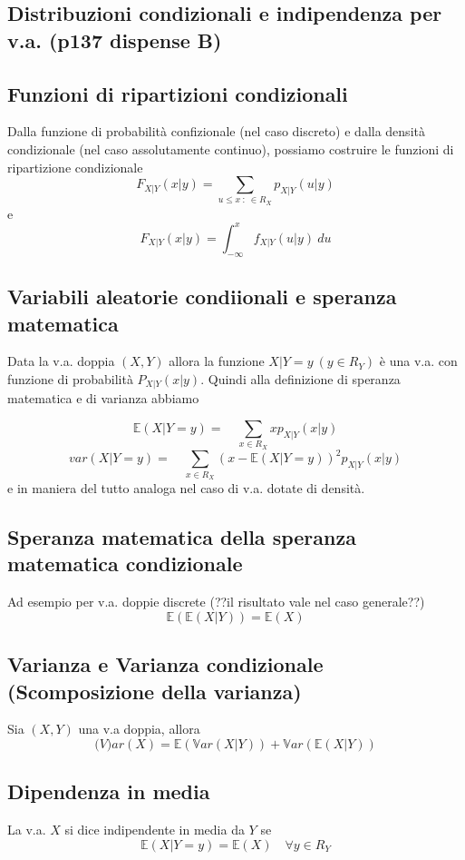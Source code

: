 \documentclass[a4paper]{report}
\begin{document}
  \subsection{Distribuzioni condizionali e indipendenza per v.a. (p137 dispense B)}

  \subsection{Funzioni di ripartizioni condizionali}
  Dalla funzione di probabilità confizionale (nel caso discreto) e dalla densità condizionale (nel caso assolutamente continuo), possiamo costruire le funzioni di ripartizione condizionale
  \[ F_{X|Y}(x|y) = \sum_{u \leq x \: : \: \in R_X} p_{X|Y}(u|y) \]
  e
  \[ F_{X|Y}(x|y) = \int_{-\infty}^{x} f_{X|Y}(u|y) \: du \]

  \subsection{Variabili aleatorie condiionali e speranza matematica}
  Data la v.a. doppia $(X,Y)$ allora la funzione $X|Y = y \: (y \in R_Y)$ è una v.a. con funzione di probabilità $P_{X|Y}(x|y)$.
    Quindi alla definizione di speranza matematica e di varianza abbiamo

  \[\mathbb{E}(X|Y=y)= \quad \sum_{x \in R_X} x p_{X|Y}(x|y) \]
  \[ var(X|Y=y)= \quad \sum_{x\in R_X}(x - \mathbb{E}(X|Y=y))^2 p_{X|Y}(x|y) \]
  e in maniera del tutto analoga nel caso di v.a. dotate di densità.

  \subsection{Speranza matematica della speranza matematica condizionale}
  Ad esempio per v.a. doppie discrete (??il risultato vale nel caso generale??)
  \[ \mathbb{E}(\mathbb{E}(X|Y)) = \mathbb{E}(X) \]

  \subsection{Varianza e Varianza condizionale (Scomposizione della varianza)}
  Sia $(X,Y)$ una v.a doppia, allora
  \[ \mathbb(V)ar(X) = \mathbb{E}(\mathbb{V}ar(X|Y)) + \mathbb{V}ar(\mathbb{E}(X|Y)) \]

  \subsection{Dipendenza in media}
  La v.a. $X$ si dice indipendente in media da $Y$ se
  \[ \mathbb{E}(X|Y=y) = \mathbb{E}(X) \quad \forall y \in R_Y \]
\end{document}

